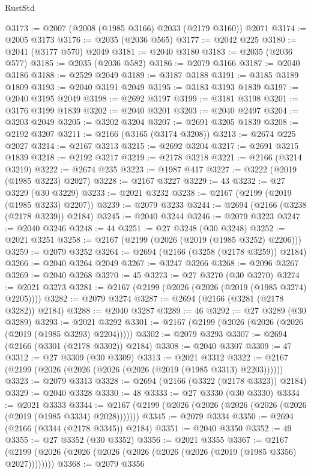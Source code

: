 \begin{lexlean}{RustStd}
\begin{coremodule}
@3173 := @2007 (@2008 (@1985 @3166) @2033 (@2179 @3160)) @2071
@3174 := @2005 @3173
@3176 := @2035 (@2036 @565)
@3177 := @2042 @225
@3180 := @2041 (@3177 @570) @2049
@3181 := @2040 @3180
@3183 := @2035 (@2036 @577)
@3185 := @2035 (@2036 @582)
@3186 := @2079 @3166
@3187 := @2040 @3186
@3188 := @2529 @2049
@3189 := @3187 @3188
@3191 := @3185 @3189 @1809
@3193 := @2040 @3191 @2049
@3195 := @3183 @3193 @1839
@3197 := @2040 @3195 @2049
@3198 := @2692 @3197
@3199 := @3181 @3198
@3201 := @3176 @3199 @1839
@3202 := @2040 @3201
@3203 := @2040 @2497
@3204 := @3203 @2049
@3205 := @3202 @3204
@3207 := @2691 @3205 @1839
@3208 := @2192 @3207
@3211 := @2166 (@3165 (@3174 @3208))
@3213 := @2674 @225 @2027
@3214 := @2167 @3213
@3215 := @2692 @3204
@3217 := @2691 @3215 @1839
@3218 := @2192 @3217
@3219 := @2178 @3218
@3221 := @2166 (@3214 @3219)
@3222 := @2674 @235
@3223 := @1987 @417
@3227 := @3222 (@2019 (@1985 @3223) @2027)
@3228 := @2167 @3227
@3229 := 43
@3232 := @27 @3229 (@30 @3229)
@3233 := @2021 @3232
@3238 := @2167 (@2199 (@2019 (@1985 @3233) @2207))
@3239 := @2079 @3233
@3244 := @2694 (@2166 (@3238 (@2178 @3239)) @2184)
@3245 := @2040 @3244
@3246 := @2079 @3223
@3247 := @2040 @3246
@3248 := 44
@3251 := @27 @3248 (@30 @3248)
@3252 := @2021 @3251
@3258 := @2167 (@2199 (@2026 (@2019 (@1985 @3252) @2206)))
@3259 := @2079 @3252
@3264 := @2694 (@2166 (@3258 (@2178 @3259)) @2184)
@3266 := @2040 @3264 @2049
@3267 := @3247 @3266
@3268 := @2096 @3267
@3269 := @2040 @3268
@3270 := 45
@3273 := @27 @3270 (@30 @3270)
@3274 := @2021 @3273
@3281 := @2167 (@2199 (@2026 (@2026 (@2019 (@1985 @3274) @2205))))
@3282 := @2079 @3274
@3287 := @2694 (@2166 (@3281 (@2178 @3282)) @2184)
@3288 := @2040 @3287
@3289 := 46
@3292 := @27 @3289 (@30 @3289)
@3293 := @2021 @3292
@3301 := @2167 (@2199 (@2026 (@2026 (@2026 (@2019 (@1985 @3293) @2204)))))
@3302 := @2079 @3293
@3307 := @2694 (@2166 (@3301 (@2178 @3302)) @2184)
@3308 := @2040 @3307
@3309 := 47
@3312 := @27 @3309 (@30 @3309)
@3313 := @2021 @3312
@3322 := @2167 (@2199 (@2026 (@2026 (@2026 (@2026 (@2019 (@1985 @3313) @2203))))))
@3323 := @2079 @3313
@3328 := @2694 (@2166 (@3322 (@2178 @3323)) @2184)
@3329 := @2040 @3328
@3330 := 48
@3333 := @27 @3330 (@30 @3330)
@3334 := @2021 @3333
@3344 := @2167 (@2199 (@2026 (@2026 (@2026 (@2026 (@2026 (@2019 (@1985 @3334) @2028)))))))
@3345 := @2079 @3334
@3350 := @2694 (@2166 (@3344 (@2178 @3345)) @2184)
@3351 := @2040 @3350
@3352 := 49
@3355 := @27 @3352 (@30 @3352)
@3356 := @2021 @3355
@3367 := @2167 (@2199 (@2026 (@2026 (@2026 (@2026 (@2026 (@2026 (@2019 (@1985 @3356) @2027))))))))
@3368 := @2079 @3356

\end{coremodule}
\end{lexlean}
